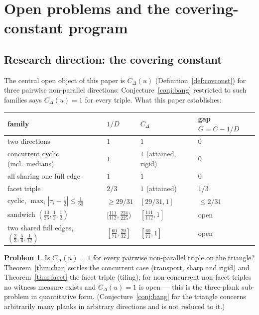 \documentclass[11pt,reqno]{amsart}
\theoremstyle{plain}
\theoremstyle{definition}
\newtheorem{problem}[theorem]{Problem}
\theoremstyle{remark}
\begin{document}
\section{Open problems and the covering-constant program}
\label{sec:problems}

\subsection*{Research direction: the covering constant}
The central open object of this paper is $C_\Delta(u)$
(Definition~\ref{def:covconst}) for three pairwise non-parallel directions:
Conjecture~\ref{conj:bang} restricted to such families says $C_\Delta(u)=1$
for every triple. What this paper establishes:

\begin{center}
\begin{tabular}{@{}llll@{}}
\hline
family & $1/D$ & $C_\Delta$ & gap $G=C-1/D$\\
\hline
two directions & $1$ & $1$ & $0$\\
concurrent cyclic (incl.\ medians) & $1$ & $1$ (attained, rigid) & $0$\\
all sharing one full edge & $1$ & $1$ & $0$\\
facet triple & $2/3$ & $1$ (attained) & $1/3$\\
cyclic, $\max_i|\tau_i-\tfrac12|\le\tfrac1{60}$ & $\ge29/31$ & $[29/31,1]$
 & $\le2/31$\\
sandwich $(\tfrac{13}{25},\tfrac12,\tfrac12)$ & $[\tfrac{111}{112},
\tfrac{224}{225})$ & $[\tfrac{111}{112},1]$ & open\\
two shared full edges, $(\tfrac23,\tfrac56,\tfrac1{12})$
 & $[\tfrac{60}{71},\tfrac{29}{32}]$ & $[\tfrac{60}{71},1]$ & open\\
\hline
\end{tabular}
\end{center}

\begin{problem}\label{prob:covconst}
Is $C_\Delta(u)=1$ for every pairwise non-parallel triple on the triangle?
Theorem~\ref{thm:char} settles the concurrent case (transport, sharp and
rigid) and Theorem~\ref{thm:facet} the facet triple (tiling); for
non-concurrent non-facet triples no witness measure exists and $C_\Delta(u)=1$
is open --- this is the three-plank sub-problem in quantitative form.
(Conjecture~\ref{conj:bang} for the triangle concerns arbitrarily many planks
in arbitrary directions and is not reduced to it.)
\end{problem}
\end{document}
